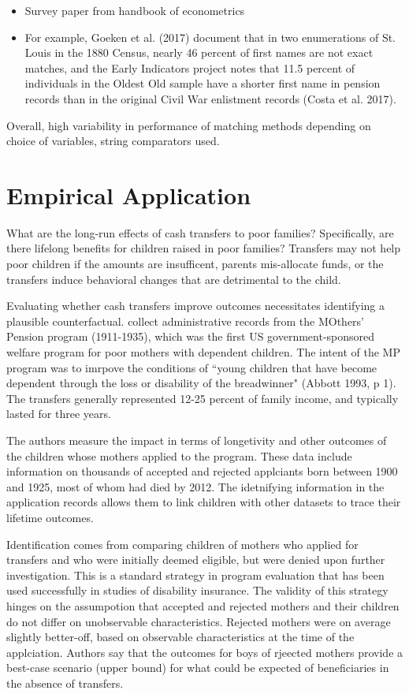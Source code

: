 \documentclass[12pt]{article}
\begin{document}
\begin{itemize}
\item Survey paper from handbook of econometrics
\item For example, Goeken et al. (2017) document that
in two enumerations of St. Louis in the 1880 Census, nearly 46 percent of first names are not exact matches,
and the Early Indicators project notes that 11.5 percent of individuals in the Oldest Old sample have a
shorter first name in pension records than in the original Civil War enlistment records (Costa et al. 2017). 
\end{itemize}

Overall, high variability in performance of matching methods depending on choice of variables, string comparators used. 


\section*{Empirical Application}

What are the long-run effects of cash transfers to poor families?  Specifically, are there lifelong benefits for children raised in poor families?  Transfers may not help poor children if the amounts are insufficent, parents mis-allocate funds, or the transfers induce behavioral changes that are detrimental to the child.  

Evaluating whether cash transfers improve outcomes necessitates identifying a plausible counterfactual.  \cite{aizer2019}  collect administrative records from the MOthers' Pension program (1911-1935), which was the first US government-sponsored welfare program for poor mothers with dependent children.  The intent of the MP program was to imrpove the conditions of ``young children that have become dependent through the loss or disability of the breadwinner" (Abbott 1993, p 1).  The transfers generally represented 12-25 percent of family income, and typically lasted for three years.   

The authors measure the impact in terms of longetivity and other outcomes of the children whose mothers applied to the program.  These data include information on thousands of accepted and rejected applciants born between 1900 and 1925, most of whom had died by 2012.  The idetnifying information in the application records allows them to link children with other datasets to trace their lifetime outcomes.

Identification comes from comparing children of mothers who applied for transfers and who were initially deemed eligible, but were denied upon further investigation.  This is a standard strategy in program evaluation that has been used successfully in studies of disability insurance.  The validity of this strategy hinges on the assumpotion that accepted and rejected mothers and their children do not differ on unobservable characteristics.  Rejected mothers were on average slightly better-off, based on observable characteristics at the time of the applciation.    Authors say that the outcomes for boys of rjeected mothers provide a best-case scenario (upper bound) for what could be expected of beneficiaries in the absence of transfers.  
\end{document}
